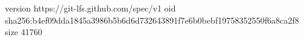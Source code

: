 version https://git-lfs.github.com/spec/v1
oid sha256:b4ef09dda1845a3986b5b6d6d732643891f7e6b0bebf19758352550f6a8ca2f8
size 41760
